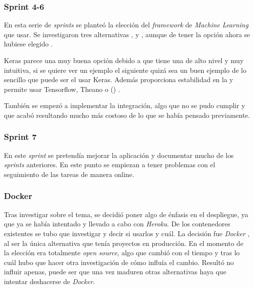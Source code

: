 \subsubsection{Sprint 4-6}
En esta serie de \emph{sprints} se planteó la elección del \emph{framework} de \emph{Machine Learning}  que usar. Se investigaron tres alternativas ,  y , aunque de tener la opción ahora se hubiese elegido .

Keras parece una muy buena opción debido a que tiene una  de alto nivel y muy intuitiva, si se quiere ver un ejemplo el siguiente  quizá sea un buen ejemplo de lo sencillo que puede ser el usar Keras. 
Además proporciona estabilidad en la  y permite usar Tensorflow, Theano o  () .

También se empezó a implementar la integración, algo que no se pudo cumplir y que acabó resultando mucho más costoso de lo que se había pensado previamente.



\subsubsection{Sprint 7}
En este \emph{sprint} se pretendía mejorar la aplicación y documentar mucho de los \emph{sprints} anteriores.
En este punto se empiezan a tener problemas con el seguimiento de las tareas de manera online.

\subsubsection{Docker}
Tras investigar sobre el tema, se decidió poner algo de énfasis en el despliegue, ya que ya se había intentado y llevado a cabo con \emph{Heroku}. De los contenedores existentes se tubo que investigar y decir si usarlos y cuál. La decisión fue \emph{Docker} , al ser la única alternativa que tenía proyectos en producción. En el momento de la elección era totalmente \emph{open source}, algo que cambió con el tiempo y tras lo cuál hubo que hacer otra investigación de cómo influía el cambio. Resultó no influir apenas, puede ser que una vez maduren otras alternativas haya que intentar deshacerse de \emph{Docker}.\cite{learndock}

